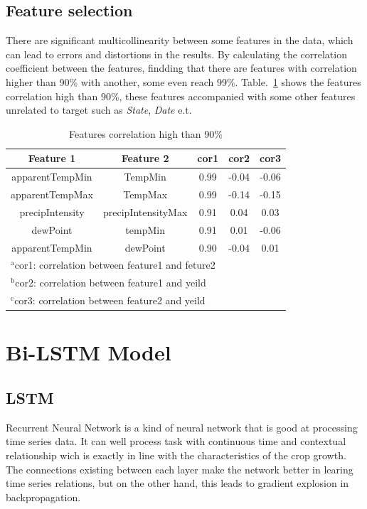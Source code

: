 \documentclass[conference]{IEEEtran}
\begin{document}
\subsection{Feature selection}
  There are significant multicollinearity between some features in the data, which can lead to errors and distortions in the results\cite{farrar1967multicollinearity}. By calculating the correlation coefficient between the features, findding that there are features with correlation higher than 90\% with another, some even reach 99\%. Table.~\ref{tab:correlation} shows the features correlation high than 90\%, these features accompanied with some other features unrelated to target such as \textit{State}, \textit{Date} e.t. 
\begin{table}[htbp]
\caption{Features correlation high than 90\%}
\begin{center}
\begin{tabular}{|c|c|c|c|c|}
\hline
Feature 1 & Feature 2 & cor1 & cor2 & cor3\\
\hline
apparentTempMin & TempMin     & 0.99 & -0.04 & -0.06 \\
apparentTempMax & TempMax     & 0.99 & -0.14 & -0.15 \\
precipIntensity & precipIntensityMax & 0.91 & 0.04  & 0.03  \\
dewPoint & tempMin & 0.91 & 0.01  & -0.06 \\
apparentTempMin & dewPoint & 0.90 & -0.04 & 0.01 \\
\hline
\multicolumn{5}{l}{$^{\mathrm{a}}$cor1: correlation between feature1 and feture2} \\
\multicolumn{5}{l}{$^{\mathrm{b}}$cor2: correlation between feature1 and yeild} \\ 
\multicolumn{5}{l}{$^{\mathrm{c}}$cor3: correlation between feature2 and yeild} \\
\end{tabular}
\label{tab:correlation}
\end{center}
\end{table}




\section{Bi-LSTM Model} \label{sec:model}
\subsection{LSTM}
  Recurrent Neural Network is a kind of neural network that is good at processing time series data. It can well process task with continuous time and contextual relationship wich is exactly in line with the characteristics of the crop growth. The connections existing between each layer make the network better in learing time series relations, but on the other hand, this leads to gradient explosion in backpropagation. \cite{hochreiter1997long}
\end{document}
